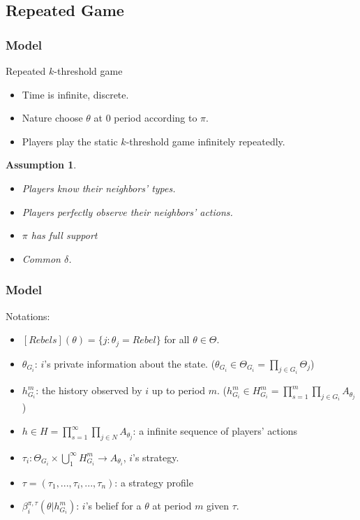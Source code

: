 \documentclass[10pt]{beamer}
\newtheorem{assumption}{Assumption}[section]
\begin{document}
\subsection{Repeated Game}
\begin{frame}
  \frametitle{Model}
Repeated $k$-threshold game
  \begin{itemize}

  \item  Time is infinite, discrete.
  \item Nature choose $\theta$ at $0$ period according to $\pi$.
  \item Players play the static $k$-threshold game infinitely repeatedly.


  \end{itemize}

\begin{assumption}
\begin{itemize}
\item Players know their neighbors' types.
\item Players perfectly observe their neighbors' actions. 
  \item $\pi$ has full support

\item Common $\delta$. 
\end{itemize}

\end{assumption}

\end{frame}

\begin{frame}
  \frametitle{Model}

Notations:
\begin{itemize}
\item $[Rebels](\theta)=\{j:\theta_j=Rebel\}$ for all $\theta\in \Theta$.
\item $\theta_{G_i}$: $i$'s private information about the state. ($\theta_{G_i}\in \Theta_{G_i}=\prod_{j\in G_i}\Theta_j$)
\item $h^{m}_{G_i}$: the history observed by $i$ up to period $m$. ($h^{m}_{G_i}\in H^{m}_{G_i}=\prod^m_{s=1}\prod_{j\in G_i}A_{\theta_j}$)
\item $h\in H=\prod^{\infty}_{s=1}\prod_{j\in N}A_{\theta_j}$: a infinite sequence of players' actions 
\item $\tau_i:\Theta_{G_i}\times \bigcup^{\infty}_{1} H^{m}_{G_i} \rightarrow A_{\theta_i}$, $i$'s strategy.
\item $\tau=(\tau_1,...,\tau_i,...,\tau_n)$: a strategy profile
\item $\beta^{\pi,\tau}_i(\theta|h^{m}_{G_i})$: $i$'s belief for a $\theta$ at period $m$ given $\tau$.

 
\end{itemize}

\end{frame}
\end{document}
